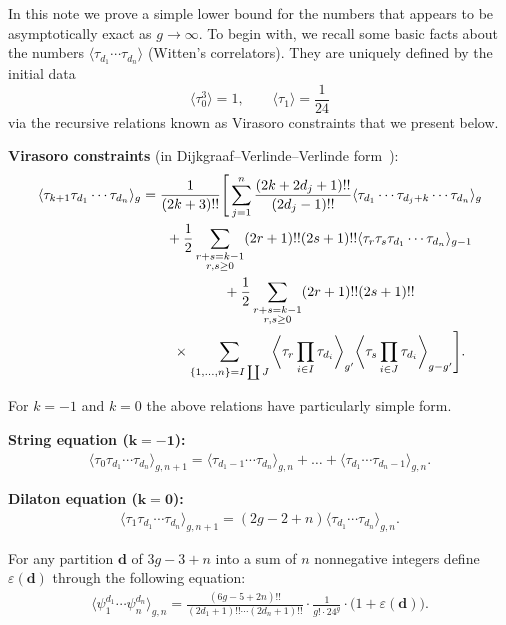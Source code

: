 \documentclass[pdftex]{sigma}
\renewcommand{\epsilon}{\varepsilon}
\theoremstyle{definition}
\begin{document}
In this note we prove a simple lower bound for the numbers
that appears to be asymptotically exact as $g\to\infty$. To
begin with, we recall some basic facts about the numbers
$\langle\tau_{d_1}\cdots\tau_{d_n}\rangle$ (Witten's
correlators). They are uniquely defined by the initial data
\[
\big\langle \tau_0^3 \big\rangle = 1,\qquad
\langle \tau_{1} \rangle = \frac{1}{24}
\]
via the recursive relations known as Virasoro constraints that we present below.

\textbf{Virasoro constraints} (in Dijkgraaf--Verlinde--Verlinde form~\cite{Dij, DVV}):
\begin{gather}
\langle\tau_{k+1}\tau_{d_1}\cdots\tau_{d_n}\rangle_g=\frac{1}{(2k+3)!!}\Bigg[\sum_{j=1}^n
\frac{(2k+2d_j+1)!!}{(2d_j-1)!!}\langle\tau_{d_1}\cdots
\tau_{d_{j}+k}\cdots\tau_{d_n}\rangle_g\nonumber\\
\hphantom{\langle\tau_{k+1}\tau_{d_1}\cdots\tau_{d_n}\rangle_g=}{} +\frac{1}{2}\sum_{\substack{r+s=k-1\\r,s\ge 0}}
(2r+1)!!(2s+1)!!\langle\tau_r\tau_s\tau_{d_1}\cdots\tau_{d_n}\rangle_{g-1}\nonumber\\
\hphantom{\langle\tau_{k+1}\tau_{d_1}\cdots\tau_{d_n}\rangle_g=}{} +\frac{1}{2}\sum_{\substack{r+s=k-1\\r,s\ge 0}} (2r+1)!!(2s+1)!!\nonumber\\
\hphantom{\langle\tau_{k+1}\tau_{d_1}\cdots\tau_{d_n}\rangle_g=}{}\times
\sum_{\{1,\dots,n\}=I\coprod J}\bigg\langle\tau_r\prod_{i\in
I}\tau_{d_i}\bigg\rangle_{g'}\bigg\langle\tau_s\prod_{i\in
J}\tau_{d_i}\bigg\rangle_{g-g'}\Bigg].\label{eq:virasoro}
\end{gather}

For $k=-1$ and $k=0$ the above relations have particularly simple form.

\textbf{String equation ($\boldsymbol{k=-1}$):}
\begin{gather}\label{eq:string}
\langle \tau_0\tau_{d_1} \cdots \tau_{d_n}\rangle_{g,n+1}
=\langle \tau_{d_1-1} \cdots \tau_{d_n}\rangle_{g,n}
+\dots
+\langle \tau_{d_1} \cdots \tau_{d_n-1}\rangle_{g,n} .
\end{gather}

\textbf{Dilaton equation ($\boldsymbol{k=0}$):}
\begin{gather*}%
\langle \tau_1\tau_{d_1} \cdots \tau_{d_n}\rangle_{g,n+1}
=(2g-2+n)\langle \tau_{d_1} \cdots \tau_{d_n}\rangle_{g,n} .
\end{gather*}

For any partition $\boldsymbol{d}$ of $3g-3+n$
into a sum of $n$ nonnegative integers define
$\epsilon(\boldsymbol{d})$ through the following equation:
\begin{gather*}%
\big\langle \psi_1^{d_1} \cdots \psi_n^{d_n}\big\rangle_{g,n}
=
\frac{(6g-5+2n)!!}{(2d_1+1)!!\cdots(2d_n+1)!!}
\cdot\frac{1}{g!\cdot 24^g} \cdot\big(1+\epsilon(\boldsymbol{d})\big) .
\end{gather*}
\end{document}
